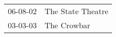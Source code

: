 \begin{supertabular}{p{0.07\textwidth}p{0.23\textwidth}}
 06-08-02 &  The State Theatre \\
 03-03-03 &        The Crowbar \\
\end{supertabular}
